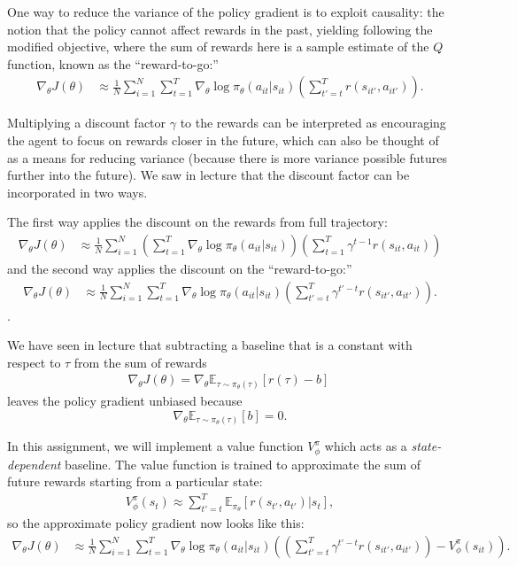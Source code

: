 \documentclass[12pt]{article}
\begin{document}
One way to reduce the variance of the policy gradient is to exploit causality: the notion that the policy cannot affect rewards in the past, yielding following the modified objective, where the sum of rewards here is a sample estimate of the $Q$ function, known as the ``reward-to-go:''
\begin{align}
\nabla_\theta J(\theta) &\approx \frac{1}{N} \sum_{i=1}^N \sum_{t=1}^T \nabla_\theta \log \pi_\theta(a_{it} | s_{it})\left(\sum_{t'=t}^T r(s_{it'}, a_{it'})\right).
\end{align}

Multiplying a discount factor $\gamma$ to the rewards can be interpreted as encouraging the agent to focus on rewards closer in the future, which can also be thought of as a means for reducing variance (because there is more variance possible futures further into the future). We saw in lecture that the discount factor can be incorporated in two ways.

The first way applies the discount on the rewards from full trajectory:
\begin{align} \label{discount_full}
\nabla_\theta J(\theta) &\approx \frac{1}{N} \sum_{i=1}^N \left(\sum_{t=1}^T \nabla_\theta \log \pi_\theta(a_{it} | s_{it})\right)\left(\sum_{t=1}^T \gamma^{t-1} r(s_{it}, a_{it})\right)
\end{align}
and the second way applies the discount on the ``reward-to-go:''
\begin{align} \label{discount_rtg}
\nabla_\theta J(\theta) &\approx \frac{1}{N} \sum_{i=1}^N \sum_{t=1}^T \nabla_\theta \log \pi_\theta(a_{it} | s_{it})\left(\sum_{t'=t}^T \gamma^{t'-t} r(s_{it'}, a_{it'})\right).
\end{align}.

We have seen in lecture that subtracting a baseline that is a constant with respect to $\tau$ from the sum of rewards
\begin{align} \label{constant_wrt_tau}
\nabla_\theta J(\theta) = \nabla_\theta \mathbb{E}_{\tau \sim \pi_\theta(\tau)} \left[r(\tau) - b\right]\
\end{align}
leaves the policy gradient unbiased because $$\nabla_\theta \mathbb{E}_{\tau \sim \pi_\theta(\tau)} \left[b\right] = 0.$$

In this assignment, we will implement a value function $V_\phi^\pi$ which acts as a \textit{state-dependent} baseline. The value function is trained to approximate the sum of future rewards starting from a particular state:
\begin{align}
V_\phi^\pi(s_t) \approx \sum_{t'=t}^T \mathbb{E}_{\pi_\theta} \left[r(s_{t'}, a_{t'}) | s_t\right],
\end{align}
so the approximate policy gradient now looks like this:
\begin{align} \label{state_dependent_baseline}
\nabla_\theta J(\theta) &\approx \frac{1}{N} \sum_{i=1}^N \sum_{t=1}^T \nabla_\theta \log \pi_\theta(a_{it} | s_{it})\left(\left(\sum_{t'=t}^T \gamma^{t'-t} r(s_{it'}, a_{it'})\right) - V_\phi^\pi\left(s_{it}\right)\right).
\end{align}
\end{document}
